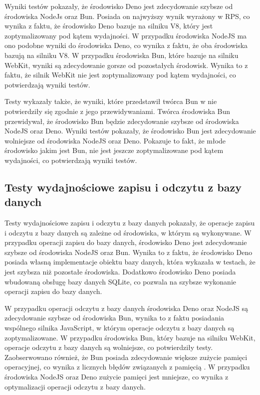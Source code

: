 Wyniki testów pokazały, że środowisko Deno jest zdecydowanie szybsze od środowiska NodeJs oraz Bun. Posiada on najwyższy wynik wyrażony w RPS, co wynika z faktu, że środowisko Deno bazuje na silniku V8, który jest zoptymalizowany pod kątem wydajności. W przypadku środowiska NodeJS ma ono podobne wyniki do środowiska Deno, co wynika z faktu, że oba środowiska bazują na silniku V8. W przypadku środowiska Bun, które bazuje na silniku WebKit, wyniki są zdecydowanie gorsze od pozostałych środowisk. Wynika to z faktu, że silnik WebKit nie jest zoptymalizowany pod kątem wydajności, co potwierdzają wyniki testów.

Testy wykazały także, że wyniki, które przedstawił twórca Bun w \cite{bun_test} nie potwierdziły się zgodnie z jego przewidywaniami. Twórca środowiska Bun przewidywał, że środowisko Bun będzie zdecydowanie szybsze od środowiska NodeJS oraz Deno. Wyniki testów pokazały, że środowisko Bun jest zdecydowanie wolniejsze od środowiska NodeJS oraz Deno. Pokazuje to fakt, że młode środowisko jakim jest Bun, nie jest jeszcze zoptymalizowane pod kątem wydajności, co potwierdzają wyniki testów.

\subsection{Testy wydajnościowe zapisu i odczytu z bazy danych}
Testy wydajnościowe zapisu i odczytu z bazy danych pokazały, że operacje zapisu i odczytu z bazy danych są zależne od środowiska, w którym są wykonywane. W przypadku operacji zapisu do bazy danych, środowisko Deno jest zdecydowanie szybsze od środowiska NodeJS oraz Bun. Wynika to z faktu, że środowisko Deno posiada własną implementacje obiektu bazy danych, która wykazała w testach, że jest szybsza niż pozostałe środowiska. Dodatkowo środowisko Deno posiada wbudowaną obsługę bazy danych SQLite, co pozwala na szybsze wykonanie operacji zapisu do bazy danych.

W przypadku operacji odczytu z bazy danych środowiska Deno oraz NodeJS są zdecydowanie szybsze od środowiska Bun, wynika to z faktu posiadania wspólnego silnika JavaScript, w którym operacje odczytu z bazy danych są zoptymalizowane. W przypadku środowiska Bun, który bazuje na silniku WebKit, operacje odczytu z bazy danych są wolniejsze, co potwierdziły testy. Zaobserwowano również, że Bun posiada zdecydowanie większe zużycie pamięci operacyjnej, co wynika z licznych błędów związanych z pamięcią \cite{bun_memory}. W przypadku środowiska NodeJS oraz Deno zużycie pamięci jest mniejsze, co wynika z optymalizacji operacji odczytu z bazy danych.

